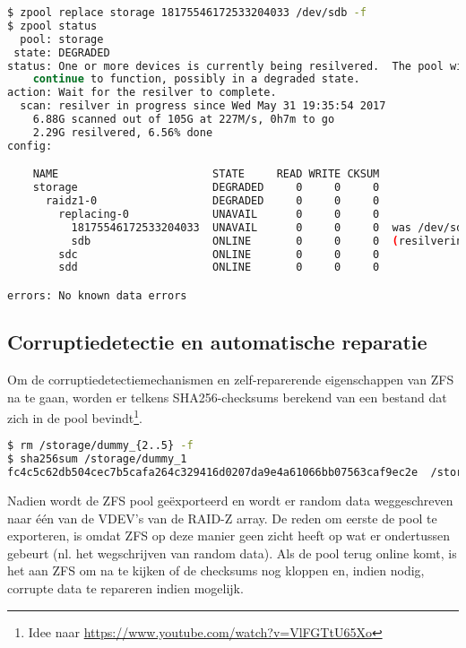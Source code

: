 \begin{lstlisting}[language=bash,style=command_style]
$ zpool replace storage 18175546172533204033 /dev/sdb -f
$ zpool status 
  pool: storage
 state: DEGRADED
status: One or more devices is currently being resilvered.  The pool will
	continue to function, possibly in a degraded state.
action: Wait for the resilver to complete.
  scan: resilver in progress since Wed May 31 19:35:54 2017
    6.88G scanned out of 105G at 227M/s, 0h7m to go
    2.29G resilvered, 6.56% done
config:

	NAME                        STATE     READ WRITE CKSUM
	storage                     DEGRADED     0     0     0
	  raidz1-0                  DEGRADED     0     0     0
	    replacing-0             UNAVAIL      0     0     0
	      18175546172533204033  UNAVAIL      0     0     0  was /dev/sdb1/old
	      sdb                   ONLINE       0     0     0  (resilvering)
	    sdc                     ONLINE       0     0     0
	    sdd                     ONLINE       0     0     0

errors: No known data errors
\end{lstlisting}

\subsection{Corruptiedetectie en automatische reparatie}

Om de corruptiedetectiemechanismen en zelf-reparerende eigenschappen van ZFS na te gaan, worden er telkens SHA256-checksums berekend van een bestand dat zich in de pool bevindt\footnote{Idee naar \url{https://www.youtube.com/watch?v=VlFGTtU65Xo}}. 

\begin{lstlisting}[language=bash,style=command_style]
$ rm /storage/dummy_{2..5} -f
$ sha256sum /storage/dummy_1 
fc4c5c62db504cec7b5cafa264c329416d0207da9e4a61066bb07563caf9ec2e  /storage/dummy_1
\end{lstlisting}

Nadien wordt de ZFS pool geëxporteerd en wordt er random data weggeschreven naar één van de VDEV's van de RAID-Z array. De reden om eerste de pool te exporteren, is omdat ZFS op deze manier geen zicht heeft op wat er ondertussen gebeurt (nl. het wegschrijven van random data). Als de pool terug online komt, is het aan ZFS om na te kijken of de checksums nog kloppen en, indien nodig, corrupte data te repareren indien mogelijk.

